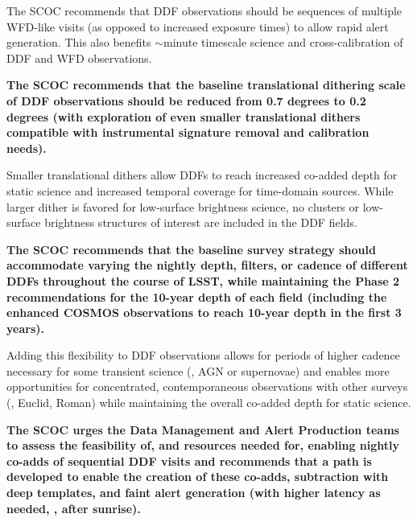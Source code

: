 
{\bg The SCOC recommends that DDF observations should be sequences of multiple WFD-like visits (as opposed to increased exposure times) to allow rapid alert generation.}
This also benefits $\sim$minute timescale science and cross-calibration of DDF and WFD observations. 

{\bf The SCOC recommends that the baseline translational dithering scale of DDF observations should be reduced from 0.7 degrees to 0.2 degrees (with exploration of even smaller translational dithers compatible with instrumental signature removal and calibration needs).
}

Smaller translational dithers allow DDFs to reach increased co-added depth for static science and increased temporal coverage for time-domain sources. While larger dither is favored for low-surface brightness science, no clusters or low-surface brightness structures of interest are included in the DDF fields.


{\bf The SCOC recommends that the baseline survey strategy should accommodate varying the nightly depth, filters, or cadence of different DDFs throughout the course of LSST, while maintaining the Phase 2 recommendations for the 10-year depth of each field (including the enhanced COSMOS observations to reach 10-year depth in the first 3 years).}

Adding this flexibility to DDF observations allows for periods of higher cadence necessary for some transient science (\eg , AGN or supernovae) and enables more opportunities for concentrated, contemporaneous observations with other surveys (\eg , Euclid, Roman) while maintaining the overall co-added depth for static science.

{\bf The SCOC urges the Data Management and Alert Production teams to assess the feasibility of, and resources needed for, enabling nightly co-adds of sequential DDF visits and recommends that a path is developed to enable the creation of these co-adds, subtraction with deep templates, and faint alert generation (with higher latency as needed, \eg , after sunrise). 
}

